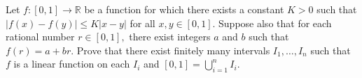 Let $f:[0,1]\to\mathbb{R}$ be a function for which there exists a constant $K>0$ such that $|f(x)-f(y)|\le K|x-y|$ for all $x,y\in [0,1].$ Suppose also that for each rational number $r\in [0,1],$ there exist integers $a$ and $b$ such that $f(r)=a+br.$ Prove that there exist finitely many intervals $I_1,\dots,I_n$ such that $f$ is a linear function on each $I_i$ and $[0,1]=\bigcup_{i=1}^nI_i.$